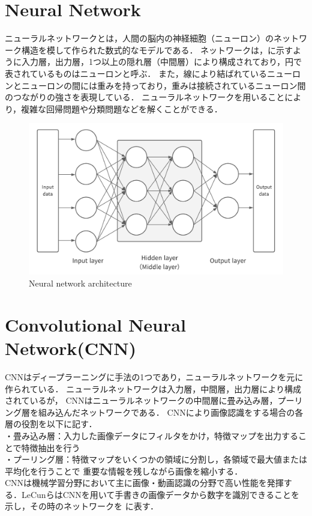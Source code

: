 \documentclass[../main]{subfiles}
\begin{document}
        \section{Neural Network}
        ニューラルネットワークとは，人間の脳内の神経細胞（ニューロン）のネットワーク構造を模して作られた数式的なモデルである．
        ネットワークは，に示すように入力層，出力層，1つ以上の隠れ層（中間層）により構成されており，円で表されているものはニューロンと呼ぶ．
        また，線により結ばれているニューロンとニューロンの間には重みを持っており，重みは接続されているニューロン間のつながりの強さを表現している．
        ニューラルネットワークを用いることにより，複雑な回帰問題や分類問題などを解くことができる．
        \begin{figure}[H]
         \centering
         \includegraphics[width=12cm]{../images/NN.png}
         \caption{Neural network architecture}
         \label{figure::NN}
        \end{figure}

        \newpage
        
        \section{Convolutional Neural Network(CNN)}
        CNNはディープラーニングに手法の1つであり，ニューラルネットワークを元に作られている．
        ニューラルネットワークは入力層，中間層，出力層により構成されているが，
        CNNはニューラルネットワークの中間層に畳み込み層，プーリング層を組み込んだネットワークである．
        CNNにより画像認識をする場合の各層の役割を以下に記す．\\
        ・畳み込み層：入力した画像データにフィルタをかけ，特徴マップを出力することで特徴抽出を行う\\
        ・プーリング層：特徴マップをいくつかの領域に分割し，各領域で最大値または平均化を行うことで
        重要な情報を残しながら画像を縮小する．\\
        CNNは機械学習分野において主に画像・動画認識の分野で高い性能を発揮する．LeCunら\cite{cnn_paper}はCNNを用いて手書きの画像データから数字を識別できることを示し，その時のネットワークを
        に表す．
\end{document}
